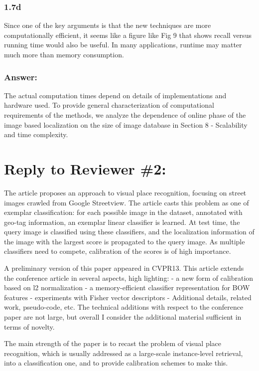 \documentclass[a4paper,12pt]{article}
\begin{document}
\subsubsection*{1.7d}
Since one of the key arguments is that the new techniques are more computationally efficient, it seems like a figure like Fig 9 that shows recall versus running time would also be useful. In many applications, runtime may matter much more than memory consumption.

\subsubsection*{Answer:}
The actual computation times depend on details of implementations and hardware used. To provide general characterization of computational requirements of the methods, we analyze the dependence of online phase of the image based localization on the size of image database in Section 8 - Scalability and time complexity.

\section*{Reply to Reviewer \#2:} 
The article proposes an approach to visual place recognition, focusing on street images crawled from Google Streetview. The article casts this problem as one of exemplar classification: for each possible image in the dataset, annotated with geo-tag information, an exemplar linear classifier is learned. At test time, the query image is classified using these classifiers, and the localization information of the image with the largest score is propagated to the query image. As multiple classifiers need to compete, calibration of the scores is of high importance.

A preliminary version of this paper appeared in CVPR13. This article extends the conference article in several aspects, high lighting:
- a new form of calibration based on l2 normalization
- a memory-efficient classifier representation for BOW features
- experiments with Fisher vector descriptors
- Additional details, related work, pseudo-code, etc.
The technical additions with respect to the conference paper are not large, but overall I consider the additional material sufficient in terms of novelty.

The main strength of the paper is to recast the problem of visual place recognition, which is usually addressed as a large-scale instance-level retrieval, into a classification one, and to provide calibration schemes to make this.
\end{document}
